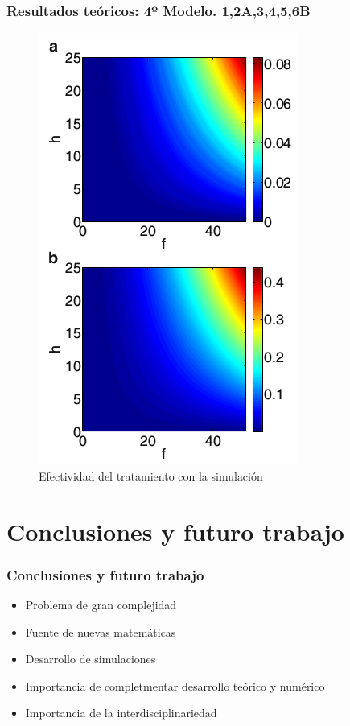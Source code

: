 \documentclass{beamer}
\begin{document}
\begin{frame}
	\frametitle{Resultados teóricos: 4º Modelo. 1,2A,3,4,5,6B}
	\begin{figure}[Atrofia cerebral]
		\includegraphics[scale=0.25]{sexta.png}
		\caption{Efectividad del tratamiento con la simulación}
		\label{cerebro4}
	\end{figure}
	
\end{frame}



\section{Conclusiones y futuro trabajo}

\begin{frame}
	\frametitle{Conclusiones y futuro trabajo}
	
	\begin{itemize}
		\item Problema de gran complejidad
		\item Fuente de nuevas matemáticas
		\item Desarrollo de simulaciones 
		\item Importancia de completmentar desarrollo teórico y numérico
		\item Importancia de la interdisciplinariedad
	\end{itemize}
\end{frame}
\end{document}
